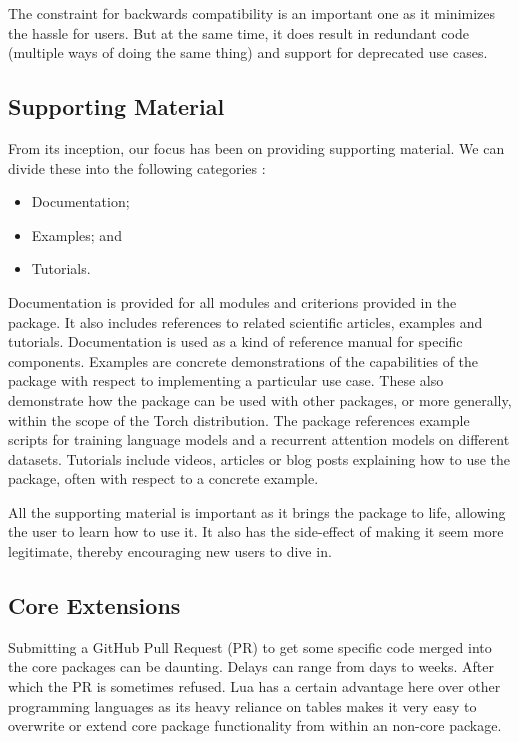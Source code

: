 \documentclass{article} %
\begin{document}
The constraint for backwards compatibility is an important one as it minimizes the hassle for users. 
But at the same time, it does result in redundant code (multiple ways of doing the same thing)
and support for deprecated use cases.

\subsection{Supporting Material}

From its inception, our focus has been on providing supporting material.
We can divide these into the following categories :

\begin{itemize}
\item Documentation;
\item Examples; and
\item Tutorials.
\end{itemize}

Documentation is provided for all modules and criterions provided in the package. 
It also includes references to related scientific articles, examples and tutorials.
Documentation is used as a kind of reference manual for specific components.
Examples are concrete demonstrations of the capabilities of the package with respect to 
implementing a particular use case. These also demonstrate how the package can 
be used with other packages, or more generally, within the scope of the Torch distribution.
The package references example scripts for training language models and
a recurrent attention models on different datasets.
Tutorials include videos, articles or blog posts explaining how to use the package, 
often with respect to a concrete example.

All the supporting material is important as it brings the package to life, 
allowing the user to learn how to use it. It also has the side-effect of 
making it seem more legitimate, thereby encouraging new users to dive in.

\subsection{Core Extensions}

Submitting a GitHub Pull Request (PR) to get some specific code merged into the core packages 
can be daunting. Delays can range from days to weeks. After which the PR is sometimes refused.
Lua has a certain advantage here over other programming languages as its heavy reliance on
tables makes it very easy to overwrite or extend core package functionality from within an non-core package.
\end{document}
